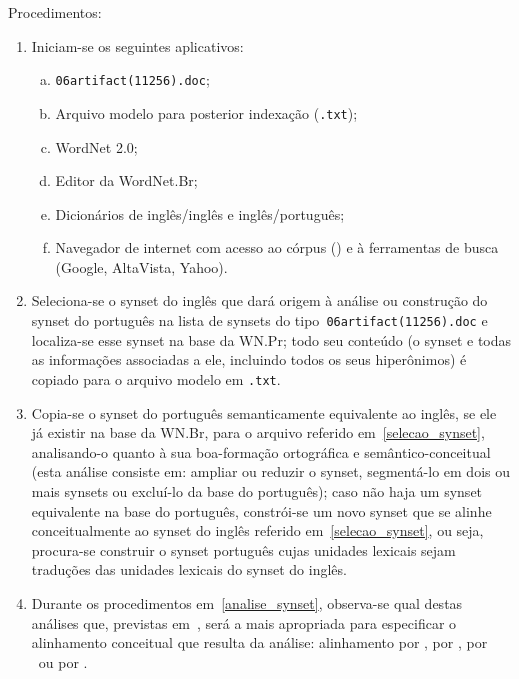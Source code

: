 Procedimentos:
	
\begin{enumerate}
  \item Iniciam-se os seguintes aplicativos:

    \begin{enumerate}[a.]
      \item \texttt{06artifact(11256).doc};
      \item Arquivo modelo para posterior indexação (\texttt{.txt});
      \item WordNet 2.0;
      \item Editor da WordNet.Br;
      \item Dicionários de inglês/inglês e inglês/português;
      \item Navegador de internet com acesso ao córpus (\nilc) e à
        ferramentas de busca (Google, AltaVista, Yahoo).
    \end{enumerate}

  \item\label{selecao_synset} Seleciona-se o synset do inglês que dará origem à
    análise ou construção do synset do português na lista de synsets do
    tipo~\texttt{06artifact(11256).doc} e localiza-se esse synset na base da
    WN.Pr; todo seu conteúdo (o synset e todas as informações associadas a ele,
    incluindo todos os seus hiperônimos) é copiado para o arquivo modelo em
    \texttt{.txt}.

  \item\label{analise_synset} Copia-se o synset do português semanticamente
    equivalente ao inglês, se ele já existir na base da WN.Br, para o arquivo
    referido em~\ref{selecao_synset}, analisando-o quanto à sua boa-formação
    ortográfica e semântico-conceitual (esta análise consiste em:  ampliar ou
    reduzir o synset, segmentá-lo em dois ou mais synsets ou excluí-lo da base
    do português); caso não haja um synset equivalente na base do português,
    constrói-se um novo synset que se alinhe conceitualmente ao synset do
    inglês referido em~\ref{selecao_synset}, ou seja, procura-se construir o
    synset português cujas unidades lexicais sejam traduções das unidades
    lexicais do synset do inglês.

  \item Durante os procedimentos em~\ref{analise_synset}, observa-se qual
    destas análises que, previstas em~, será a mais
    apropriada para especificar o alinhamento conceitual que resulta da
    análise: alinhamento por \eqsyn, por \eqnsyn, por \eqhypo\ ou por \eqhyper.


\end{enumerate}
